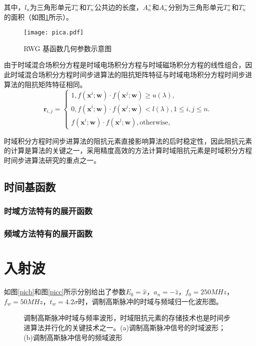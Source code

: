 \documentclass[promaster]{thesis-uestc}
\begin{document}
其中，$l_n$为三角形单元$T_n^+$和$T_n^-$公共边的长度，$A_n^+$和$A_n^-$分别为三角形单元$T_n^+$和$T_n^-$的面积（如图\ref{pica}所示）。

\begin{figure}[h]
\texttt{[image: pica.pdf]}
\caption{RWG 基函数几何参数示意图}
\label{pica}
\end{figure}

由于时域混合场积分方程是时域电场积分方程与时域磁场积分方程的线性组合，因此时域混合场积分方程时间步进算法的阻抗矩阵特征与时域电场积分方程时间步进算法的阻抗矩阵特征相同。
\begin{equation}
\label{latent_binary_variable}
\bm{r}_{i,j}=
\begin{cases}
1,f(\bm{x}^{i};\bm{w})\cdot f(\bm{x}^{j};\bm{w})\geq u(\lambda),\\
0,f(\bm{x}^{i};\bm{w})\cdot f(\bm{x}^{j};\bm{w})< l(\lambda), 1\leq i,j\leq n.\\
f(\bm{x}^{i};\bm{w})\cdot f(\bm{x}^{j};\bm{w}),\text{otherwise},
\end{cases}
\end{equation}

时域积分方程时间步进算法的阻抗元素直接影响算法的后时稳定性，因此阻抗元素的计算是算法的关键之一，采用精度高效的方法计算时域阻抗元素是时域积分方程时间步进算法研究的重点之一。


\subsection{时间基函数}

\subsubsection{时域方法特有的展开函数}

\subsubsection{频域方法特有的展开函数}

\section{入射波}

如图\ref{picb}和图\ref{picc}所示分别给出了参数$E_0=\hat{x}$，$a_n=-\hat{z}$，$f_0=250MHz$，$f_w=50MHz$，$t_w=4.2\sigma$时，调制高斯脉冲的时域与频域归一化波形图。

\begin{figure}[h]
\caption{调制高斯脉冲时域与频率波形，时域阻抗元素的存储技术也是时间步进算法并行化的关键技术之一。(a)调制高斯脉冲信号的时域波形；(b)调制高斯脉冲信号的频域波形}
\label{fig1}
\end{figure}
\end{document}
